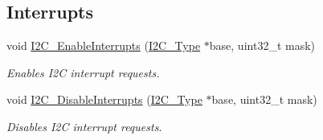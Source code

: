 \subsection*{Interrupts}
\begin{DoxyCompactItemize}
\item 
void \mbox{\hyperlink{group__i2c__driver_ga577e094cc4d39b88ec5bbe49bc199c77}{I2\+C\+\_\+\+Enable\+Interrupts}} (\mbox{\hyperlink{struct_i2_c___type}{I2\+C\+\_\+\+Type}} $\ast$base, uint32\+\_\+t mask)
\begin{DoxyCompactList}\small\item\em Enables I2C interrupt requests. \end{DoxyCompactList}\item 
void \mbox{\hyperlink{group__i2c__driver_ga9839c1fd49a0f62f42b0adfa74f62853}{I2\+C\+\_\+\+Disable\+Interrupts}} (\mbox{\hyperlink{struct_i2_c___type}{I2\+C\+\_\+\+Type}} $\ast$base, uint32\+\_\+t mask)
\begin{DoxyCompactList}\small\item\em Disables I2C interrupt requests. \end{DoxyCompactList}\end{DoxyCompactItemize}
